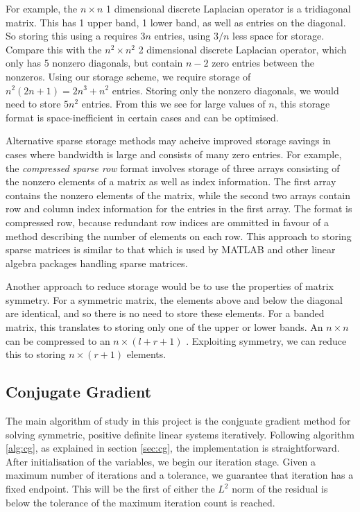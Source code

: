 For example, the $n\times n$ 1 dimensional discrete Laplacian operator is a tridiagonal matrix. 
This has 1 upper band, 1 lower band, as well as entries on the diagonal.
So storing this using a  requires $3n$ entries, using $3/n$ less space for storage.
Compare this with the $n^2\times n^2$ 2 dimensional discrete Laplacian operator, which only has 5 nonzero diagonals, but contain $n-2$ zero entries between the nonzeros.
Using our storage scheme, we require storage of $n^2(2n+1)=2n^3+n^2$ entries. 
Storing only the nonzero diagonals, we would need to store $5n^2$ entries.
From this we see for large values of $n$, this storage format is space-inefficient in certain cases and can be optimised.

Alternative sparse storage methods may acheive improved storage savings in cases where bandwidth is large and consists of many zero entries.
For example, the \textit{compressed sparse row} format involves storage of three arrays consisting of the nonzero elements of a matrix as well as index information.
The first array contains the nonzero elements of the matrix, while the second two arrays contain row and column index information for the entries in the first array.
The format is compressed row, because redundant row indices are ommitted in favour of a method describing the number of elements on each row.
This approach to storing sparse matrices is similar to that which is used by MATLAB and other linear algebra packages handling sparse matrices.

Another approach to reduce storage would be to use the properties of matrix symmetry. 
For a symmetric matrix, the elements above and below the diagonal are identical, and so there is no need to store these elements.
For a banded matrix, this translates to storing only one of the upper or lower bands.
An $n\times n$  can be compressed to an $n \times (l+r+1)$ .
Exploiting symmetry, we can reduce this to storing $n \times (r+1)$ elements.


\subsection{Conjugate Gradient}

The main algorithm of study in this project is the conjguate gradient method for solving symmetric, positive definite linear systems iteratively.
Following algorithm \ref{alg:cg}, as explained in section \ref{sec:cg}, the implementation is straightforward.
After initialisation of the variables, we begin our iteration stage. 
Given a maximum number of iterations and a tolerance, we guarantee that iteration has a fixed endpoint.
This will be the first of either the $L^{2}$ norm of the residual is below the tolerance of the maximum iteration count is reached.

